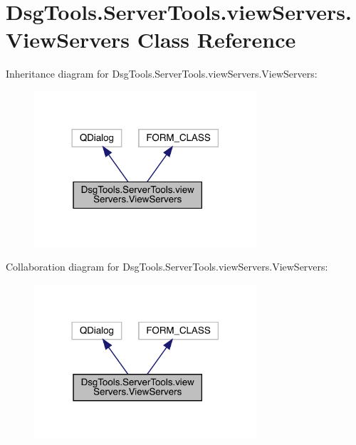 \hypertarget{class_dsg_tools_1_1_server_tools_1_1view_servers_1_1_view_servers}{}\section{Dsg\+Tools.\+Server\+Tools.\+view\+Servers.\+View\+Servers Class Reference}
\label{class_dsg_tools_1_1_server_tools_1_1view_servers_1_1_view_servers}


Inheritance diagram for Dsg\+Tools.\+Server\+Tools.\+view\+Servers.\+View\+Servers\+:
\nopagebreak
\begin{figure}[H]
\begin{center}
\leavevmode
\includegraphics[width=234pt]{class_dsg_tools_1_1_server_tools_1_1view_servers_1_1_view_servers__inherit__graph}
\end{center}
\end{figure}


Collaboration diagram for Dsg\+Tools.\+Server\+Tools.\+view\+Servers.\+View\+Servers\+:
\nopagebreak
\begin{figure}[H]
\begin{center}
\leavevmode
\includegraphics[width=234pt]{class_dsg_tools_1_1_server_tools_1_1view_servers_1_1_view_servers__coll__graph}
\end{center}
\end{figure}
